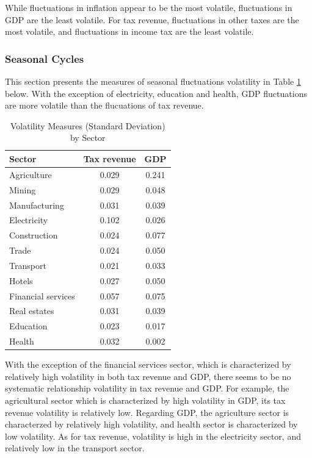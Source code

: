 \documentclass[12pt,a4paper,final]{article}
\begin{document}
While fluctuations in inflation appear to be the most volatile, fluctuations in GDP are the least volatile.  For tax revenue, fluctuations in other taxes are the most volatile, and fluctuations in income tax are the least volatile. 

\newpage
\subsubsection{Seasonal Cycles}

This section presents the measures of seasonal fluctuations volatility in Table \ref{tab5} below.  With the exception of electricity, education and health, GDP fluctuations are more volatile than the flucuations of tax revenue. 

\begin{table}[h]
\centering
\begin{small} 
\caption{Volatility Measures (Standard Deviation) by Sector} 
\label{tab5}
\begin{tabular}{l c c}
\toprule
\multicolumn{1}{l}{\textbf{Sector}} & \textbf{Tax revenue} & \textbf{GDP}\\ 
 \midrule
Agriculture & 0.029 & 0.241\\
Mining & 0.029 & 0.048\\
Manufacturing & 0.031 & 0.039\\
Electricity  & 0.102 & 0.026\\
Construction & 0.024 & 0.077 \\
Trade & 0.024 & 0.050\\
Transport & 0.021 & 0.033\\
Hotels & 0.027 & 0.050\\
Financial services & 0.057 & 0.075\\
Real estates & 0.031 & 0.039\\
Education & 0.023 & 0.017\\
Health & 0.032 & 0.002\\
\bottomrule
\end{tabular}
\end{small}
\end{table}

With the exception of the financial services sector, which is characterized by relatively high volatility in both tax revenue and GDP, there seems to be no systematic relationship volatility in tax revenue and GDP. For example, the agricultural sector which is characterized by high volatility in GDP, its tax revenue volatility is relatively low. Regarding GDP, the agriculture sector is characterzed by relatively high volatility, and health sector is characterized by low volatility.  As for tax revenue, volatility is high in the electricity sector, and relatively low in the transport sector.
\end{document}
